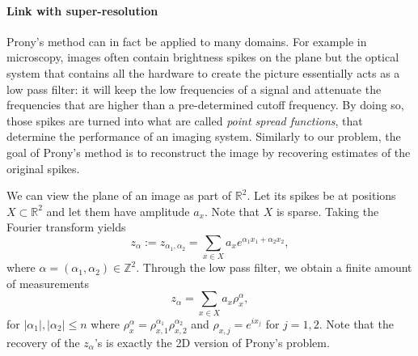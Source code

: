 \paragraph{Link with super-resolution} Prony's method can in fact be applied to many domains. For example in microscopy, images often contain brightness spikes on the plane but the optical system that contains all the hardware to create the picture essentially acts as a low pass filter: it will keep the low frequencies of a signal and attenuate the frequencies that are higher than a pre-determined cutoff frequency. By doing so, those spikes are turned into what are called \textit{point spread functions}, that determine the performance of an imaging system. Similarly to our problem, the goal of Prony's method is to reconstruct the image by recovering estimates of the original spikes.\par 
We can view the plane of an image as part of $\mathbb{R}^2$. Let its spikes be at positions $X\subset\mathbb{R}^2$ and let them have amplitude $a_x$. Note that $X$ is sparse. Taking the Fourier transform yields $$z_\alpha:=z_{\alpha_1,\alpha_2}=\sum_{x\in X}a_xe^{\alpha_1 x_1+\alpha_2 x_2},$$ where $\alpha=(\alpha_1,\alpha_2)\in\mathbb{Z}^2$. Through the low pass filter, we obtain a finite amount of measurements $$z_\alpha=\sum_{x\in X}a_x\rho_x^\alpha,$$ for $|\alpha_1|,|\alpha_2|\leq n$ where $\rho_x^\alpha=\rho_{x,1}^{\alpha_1}\rho_{x,2}^{\alpha_2}$ and $\rho_{x,j}=e^{ix_j}$ for $j=1,2$. Note that the recovery of the $z_\alpha$'s is exactly the 2D version of Prony's problem.
